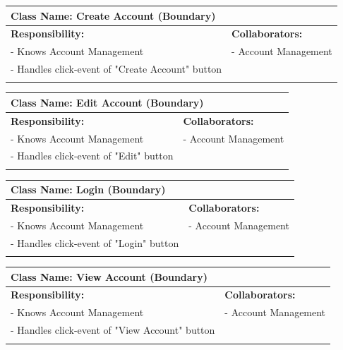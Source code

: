 {	\begin{table}[ht]
		\centering
		\begin{tabular}{|p{8cm}|p{8cm}|}
		\hline 
		 \multicolumn{2}{|l|}{\textbf{Class Name:} Create Account (Boundary)} \\
		\hline
		\textbf{Responsibility:} & \textbf{Collaborators:} \\
		\hline
		 - Knows Account Management & - Account Management \\
		 - Handles click-event of "Create Account" button \\
		\vspace{1in} & \\
		\hline
		\end{tabular}
	\end{table}

	\begin{table}[ht]
		\centering
		\begin{tabular}{|p{8cm}|p{8cm}|}
		\hline 
		 \multicolumn{2}{|l|}{\textbf{Class Name:} Edit Account (Boundary)} \\
		\hline
		\textbf{Responsibility:} & \textbf{Collaborators:} \\
		\hline
		 - Knows Account Management & - Account Management \\
		 - Handles click-event of "Edit" button \\
		\vspace{1in} & \\
		\hline
		\end{tabular}
	\end{table}

	\begin{table}[ht]
		\centering
		\begin{tabular}{|p{8cm}|p{8cm}|}
		\hline 
		 \multicolumn{2}{|l|}{\textbf{Class Name:} Login (Boundary)} \\
		\hline
		\textbf{Responsibility:} & \textbf{Collaborators:} \\
		\hline
		 - Knows Account Management & - Account Management \\
		 - Handles click-event of "Login" button \\
		\vspace{1in} & \\
		\hline
		\end{tabular}
	\end{table}

	\begin{table}[ht]
		\centering
		\begin{tabular}{|p{8cm}|p{8cm}|}
		\hline 
		 \multicolumn{2}{|l|}{\textbf{Class Name:} View Account (Boundary)} \\
		\hline
		\textbf{Responsibility:} & \textbf{Collaborators:} \\
		\hline
		 - Knows Account Management & - Account Management \\
		 - Handles click-event of "View Account" button \\
		\vspace{1in} & \\
		\hline
		\end{tabular}
	\end{table}

}
